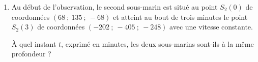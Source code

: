 \begin{enumerate}
\begin{enumerate}[label=\alph*.]
          On donnera l'arrondi de $\alpha$ à $0,1$ degré près.
     \end{enumerate}
     \item  Au début de l'observation, le second sous-marin est situé au point $S_2(0)$ de coordonnées
     $(68~;~135~;~- 68)$ et atteint au bout de trois minutes le point $S_2(3)$ de coordonnées $(-202~;~-405~;~ - 248)$ avec une vitesse constante.
     \par
     \`A quel instant $t$, exprimé en minutes, les deux sous-marins sont-ils à la même profondeur ?
\end{enumerate}
